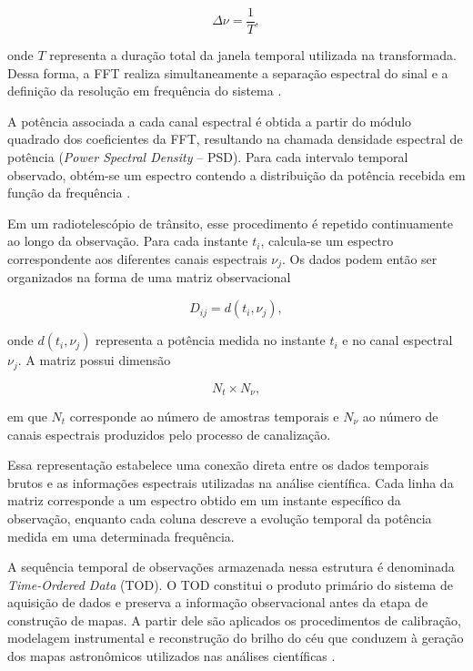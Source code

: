 \begin{equation}
\Delta \nu = \frac{1}{T},
\end{equation}

onde $T$ representa a duração total da janela temporal utilizada na transformada. Dessa forma, a FFT realiza simultaneamente a separação espectral do sinal e a definição da resolução em frequência do sistema \cite{oppenheim1999discrete}.

A potência associada a cada canal espectral é obtida a partir do módulo quadrado dos coeficientes da FFT, resultando na chamada densidade espectral de potência (\textit{Power Spectral Density} -- PSD). Para cada intervalo temporal observado, obtém-se um espectro contendo a distribuição da potência recebida em função da frequência \cite{burke2019introduction}.

Em um radiotelescópio de trânsito, esse procedimento é repetido continuamente ao longo da observação. Para cada instante $t_i$, calcula-se um espectro correspondente aos diferentes canais espectrais $\nu_j$. Os dados podem então ser organizados na forma de uma matriz observacional


\begin{equation}
D_{ij}=d(t_i,\nu_j),
\end{equation}


onde $d(t_i,\nu_j)$ representa a potência medida no instante $t_i$ e no canal espectral $\nu_j$. A matriz possui dimensão

\begin{equation}
N_t \times N_\nu,
\end{equation}

em que $N_t$ corresponde ao número de amostras temporais e $N_\nu$ ao número de canais espectrais produzidos pelo processo de canalização.

Essa representação estabelece uma conexão direta entre os dados temporais brutos e as informações espectrais utilizadas na análise científica. Cada linha da matriz corresponde a um espectro obtido em um instante específico da observação, enquanto cada coluna descreve a evolução temporal da potência medida em uma determinada frequência.


A sequência temporal de observações armazenada nessa estrutura é denominada \textit{Time-Ordered Data} (TOD). O TOD constitui o produto primário do sistema de aquisição de dados e preserva a informação observacional antes da etapa de construção de mapas. A partir dele são aplicados os procedimentos de calibração, modelagem instrumental e reconstrução do brilho do céu que conduzem à geração dos mapas astronômicos utilizados nas análises científicas \cite{tegmark1997mapmaking, keihanen2010madam}.

